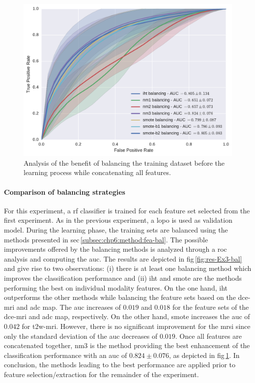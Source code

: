\begin{figure}
  \centering
  \includegraphics[width=0.7\linewidth]{content/figures/exp-3/all.pdf}
  \caption{Analysis of the benefit of balancing the training dataset before the learning process while concatenating all features.}
  \label{fig:allbalance}
\end{figure}

\paragraph{Comparison of balancing strategies}
For this experiment, a \ac{rf} classifier is trained for each feature set selected from the first experiment.
As in the previous experiment, a \ac{lopo} is used as validation model.
During the learning phase, the training sets are balanced using the methods presented in \acs{sec}\,\ref{subsec:chp6:method:fea-bal}.
The possible improvements offered by the balancing methods is analyzed through a \ac{roc} analysis and computing the \ac{auc}.
The results are depicted in \acs{fig}\,\ref{fig:res-Ex3-bal} and give rise to two observations:
(i) there is at least one balancing method which improves the classification performance and
(ii) \ac{iht} and \ac{smote} are the methods performing the best on individual modality features.
On the one hand, \ac{iht} outperforms the other methods while balancing the feature sets based on the \ac{dce}-\ac{mri} and \ac{adc} map.
The \ac{auc} increases of $0.019$ and $0.018$ for the feature sets of the \ac{dce}-\ac{mri} and \ac{adc} map, respectively.
On the other hand, \ac{smote} increases the \ac{auc} of $0.042$ for \ac{t2w}-\ac{mri}.
However, there is no significant improvement for the \ac{mrsi} since only the standard deviation of the \ac{auc} decreases of $0.019$.
Once all features are concatenated together, \ac{nm3} is the method providing the best enhancement of the classification performance with an \ac{auc} of $0.824 \pm 0.076$, as depicted in \acs{fig}\,\ref{fig:allbalance}.
In conclusion, the methods leading to the best performance are applied prior to feature selection/extraction for the remainder of the experiment.

